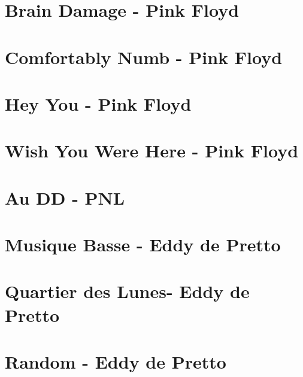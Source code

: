 \documentclass[11pt]{article}
\begin{document}
\section{Brain Damage - Pink Floyd}



\section{Comfortably Numb - Pink Floyd}
\begin{guitar}

\end{guitar}


\section{Hey You - Pink Floyd}




\section{Wish You Were Here - Pink Floyd}
\begin{guitar}

\end{guitar}


\section{Au DD - PNL}




\section{Musique Basse - Eddy de Pretto}
\begin{guitar}

\end{guitar}

\section{Quartier des Lunes- Eddy de Pretto}
\begin{guitar}

\end{guitar}

\section{Random - Eddy de Pretto}
\begin{guitar}

\end{guitar}
\end{document}
